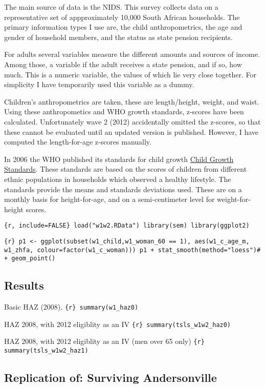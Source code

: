 \documentclass[a4paper]{book}\usepackage{graphicx, color}
\begin{document}
The main source of data is the NIDS. This survey collects data on a
representative set of appproximately 10,000 South African households.
The primary information types I use are, the child anthropometrics, the
age and gender of household members, and the status as state pension
recipients.

For adults several variables measure the different amounts and sources
of income. Among those, a variable if the adult receives a state
pension, and if so, how much. This is a numeric variable, the values of
which lie very close together. For simplicity I have temporarily used
this variable as a dummy.

Children's anthropometrics are taken, these are length/height, weight,
and waist. Using these anthropometics and WHO growth standards, z-scores
have been calculated. Unfortunately wave 2 (2012) accidentally omitted
the z-scores, so that these cannot be evaluated until an updated version
is published. However, I have computed the length-for-age z-scores
manually.

In 2006 the WHO published its standards for child growth
\href{http://www.who.int/childgrowth/en/}{Child Growth Standards}. These
standards are based on the scores of children from different ethnic
populations in households which observed a healthy lifestyle. The
standards provide the means and standards deviations used. These are on
a monthly basis for height-for-age, and on a semi-centimeter level for
weight-for-height scores.

\texttt{\{r, include=FALSE\} load("w1w2.RData") library(sem) library(ggplot2)}

\texttt{\{r\} p1 \textless{}- ggplot(subset(w1\_child,w1\_woman\_60 == 1), aes(w1\_c\_age\_m, w1\_zhfa, colour=factor(w1\_c\_woman))) p1 + stat\_smooth(method="loess")\# + geom\_point()}

\section{Results}

Basic HAZ (2008). \texttt{\{r\} summary(w1\_haz0)}

HAZ 2008, with 2012 eligiblity as an IV
\texttt{\{r\} summary(tsls\_w1w2\_haz0)}

HAZ 2008, with 2012 eligiblity as an IV (men over 65 only)
\texttt{\{r\} summary(tsls\_w1w2\_haz1)}


\begin{refsection}
\chapter{Replication of: Surviving Andersonville}

\printbibliography
\end{refsection}
\end{document}
